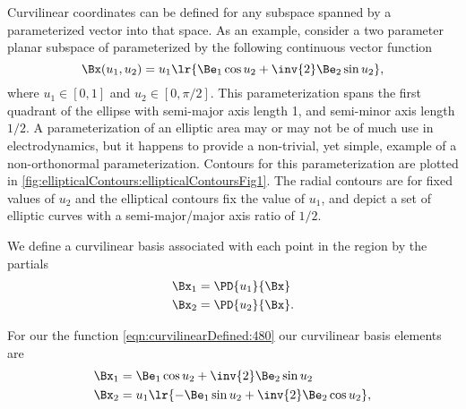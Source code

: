 %
%
Curvilinear coordinates can be defined for any subspace spanned by a parameterized vector into that space.
As an example, consider a two parameter planar subspace of parameterized by the following continuous vector function
\begin{equation}\label{eqn:curvilinearDefined:480}
\Bx(u_1, u_2) = u_1 \lr{ \Be_1 \cos u_2 + \inv{2} \Be_2 \sin u_2 },
\end{equation}
where \( u_1 \in [0,1] \) and \( u_2 \in [0, \pi/2] \).
This parameterization spans the first quadrant of the ellipse with semi-major axis length 1, and semi-minor axis length \( 1/2 \).
A parameterization of an elliptic area may or may not be of much use in electrodynamics, but it happens to provide a non-trivial, yet simple, example of a non-orthonormal parameterization.
Contours for this parameterization are plotted in \cref{fig:ellipticalContours:ellipticalContoursFig1}.
The radial contours are for fixed values of \( u_2 \) and the elliptical contours fix the value of \( u_1 \), and depict a set of elliptic curves
with a semi-major/major axis ratio of \( 1/2 \).


We define a curvilinear basis associated with each point in the region by the partials
\begin{equation}\label{eqn:curvilinearDefined:80}
\begin{aligned}
\Bx_{1} &= \PD{u_1}{\Bx} \\
\Bx_{2} &= \PD{u_2}{\Bx}.
\end{aligned}
\end{equation}

For our the function \cref{eqn:curvilinearDefined:480} our curvilinear basis elements are
\begin{equation}\label{eqn:curvilinearDefined:520}
\begin{aligned}
\Bx_1 &= \Be_1 \cos u_2 + \inv{2} \Be_2 \sin u_2 \\
\Bx_2 &= u_1 \lr{ - \Be_1 \sin u_2 + \inv{2} \Be_2 \cos u_2 },
\end{aligned}
\end{equation}

